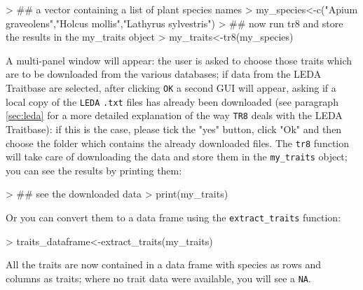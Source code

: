 \documentclass{article}
\begin{document}
\begin{Schunk}
\begin{Sinput}
> ## a vector containing a list of plant species names
> my_species<-c("Apium graveolens","Holcus mollis","Lathyrus sylvestris")
> ## now run tr8 and store the results in the my_traits object
> my_traits<-tr8(my_species)
\end{Sinput}
\end{Schunk}



  A multi-panel window will appear: the user is asked to choose those
  traits which are to be downloaded from the various databases; if data from the LEDA Traitbase are selected, after
  clicking \texttt{OK} a second GUI will appear, asking if a local copy
  of the \texttt{LEDA} \texttt{.txt} files has already been downloaded
  (see paragraph \ref{sec:leda} for a more detailed explanation of the
  way \texttt{TR8} deals with the LEDA Traitbase): if this is the case, please tick the
  "yes" button, click "Ok" and then choose the folder which contains
  the already downloaded files.  
  The \texttt{tr8} function will take care of downloading the data and
  store them in the \texttt{my\_traits} object; you can see the results
  by printing them:

\begin{Schunk}
\begin{Sinput}
> ## see the downloaded data
> print(my_traits)
\end{Sinput}
\end{Schunk}

  Or you can convert them to a data frame using the \texttt{extract\_traits} function:
  
\begin{Schunk}
\begin{Sinput}
> traits_dataframe<-extract_traits(my_traits)
\end{Sinput}
\end{Schunk}



  All the traits are now contained in a data frame with species as rows
  and columns as traits; where no trait data were available, you will
  see a \texttt{NA}. 
  
  
\end{document}
